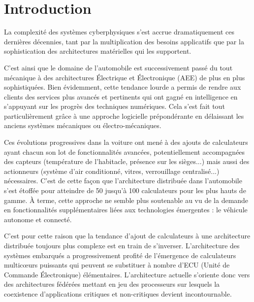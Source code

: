 \documentclass[french, a4paper, 11pt, twoside, pdftex]{StyleThese}
\begin{document}
\fi


\chapter*{Introduction}\label{chap:Introduction}

La complexité des systèmes cyberphysiques s’est accrue dramatiquement  ces dernières décennies, tant par la multiplication des besoins applicatifs que par la sophistication des architectures matérielles qui les supportent.

C'est ainsi que le domaine de l'automobile est successivement passé du tout mécanique à des architectures Électrique et Électronique (AEE) de plus en plus sophistiquées. Bien évidemment, cette tendance lourde a permis de rendre aux clients des services plus avancés et pertinents qui ont gagné en intelligence en s’appuyant sur les progrès des techniques numériques. Cela s'est fait tout particulièrement grâce à une approche logicielle prépondérante en délaissant les anciens systèmes mécaniques ou électro-mécaniques.

Ces évolutions progressives dans la voiture ont mené à des ajouts de calculateurs ayant chacun son lot de fonctionnalités avancées, potentiellement accompagnées des capteurs (température de l'habitacle, présence sur les sièges...) mais aussi des actionneurs (système d'air conditionné, vitres, verrouillage centralisé...) nécessaires.
C'est de cette façon que l'architecture distribuée dans l'automobile s'est étoffée pour atteindre de 50 jusqu'à 100 calculateurs pour les plus hauts de gamme. À terme, cette approche ne semble plus soutenable au vu de la demande en fonctionnalités supplémentaires liées aux technologies émergentes : le véhicule autonome et connecté.

C’est pour cette raison que la tendance d'ajout de calculateurs à une architecture distribuée toujours plus complexe est en train de s’inverser. L'architecture des systèmes embarqués a progressivement profité de l’émergence de calculateurs multicœurs puissants qui peuvent se substituer à nombre d’ECU (Unité de Commande Électronique) élémentaires. L’architecture actuelle s’oriente donc vers des architectures fédérées mettant en jeu des processeurs sur lesquels la coexistence d’applications critiques et non-critiques devient incontournable. 
\end{document}
